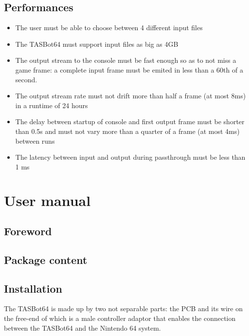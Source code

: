 \documentclass[a4paper,oneside,12pt]{article}
\begin{document}
\subsection{Performances}
\begin{itemize}
\item The user must be able to choose between 4 different input files
\item The TASBot64 must support input files as big as 4GB
\item The output stream to the console must be fast enough so as to not miss a
  game frame: a complete input frame must be emited in less than a 60th of a
  second.
\item The output stream rate must not drift more than half a frame (at most 8ms)
  in a runtime of 24 hours
\item The delay between startup of console and first output frame must be
  shorter than 0.5s and must not vary more than a quarter of a frame (at most
  4ms) between runs
\item The latency between input and output during passthrough must be less than
  1 ms
\end{itemize}

\section{User manual}
\subsection{Foreword}

\subsection{Package content}

\subsection{Installation}
The TASBot64 is made up by two not separable parts: the PCB and its wire on the
free-end of which is a male controller adaptor that enables the connection
between the TASBot64 and the Nintendo 64 system.
\end{document}
